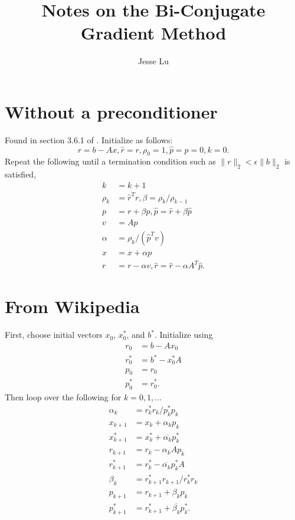 \documentclass{article}
\title{Notes on the Bi-Conjugate Gradient Method}
\author{Jesse Lu}
\begin{document}
\maketitle
\section{Without a preconditioner}
Found in section 3.6.1 of \cite{kelley}.
Initialize as follows:
\begin{equation}
r = b - Ax, \hat{r} = r, \rho_0 = 1, \hat{p} = p = 0, k = 0.
\end{equation}
Repeat the following until a termination condition 
    such as $\|r\|_2 < \epsilon \|b\|_2$ is satisfied,
    \begin{subequations}\begin{align}
    k &= k + 1 \\
    \rho_k &= \hat{r}^T r, \beta = \rho_k / \rho_{k-1} \\
    p &= r + \beta p, \hat{p} = \hat{r} + \beta \hat{p} \\
    v &= Ap \\
    \alpha &= \rho_k / (\hat{p}^T v) \\
    x &= x + \alpha p \\
    r &= r - \alpha v, \hat{r} = \hat{r} - \alpha A^T \hat{p}.
    \end{align}\end{subequations}

\section{From Wikipedia}
First, choose initial vectors $x_0$, $x_0^\ast$, and $b^\ast$.
Initialize using
    \begin{subequations}\begin{align}
    r_0 &= b - Ax_0 \\
    r_0^\ast &= b^\ast - x_0^\ast A \\
    p_0 &= r_0 \\
    p_0^\ast &= r_0^\ast.
    \end{align}\end{subequations}
Then loop over the following for $k = 0, 1, \ldots$
    \begin{subequations}\begin{align}
    \alpha_k &= r_k^\ast r_k / p_k^\ast p_k \\
    x_{k+1} &= x_k + \alpha_k p_k \\
    x_{k+1}^\ast &= x_k^\ast + \overline{\alpha_k} p_k^\ast \\
    r_{k+1} &= r_k - \alpha_k A p_k \\
    r_{k+1}^\ast &= r_k^\ast - \overline{\alpha_k} p_k^\ast A \\
    \beta_k &= r_{k+1}^\ast r_{k+1} / r_k^\ast r_k \\
    p_{k+1} &= r_{k+1} + \beta_k p_k \\
    p_{k+1}^\ast &= r_{k+1}^\ast + \overline{\beta_k} p_k^\ast.
    \end{align}\end{subequations}
\end{document}
